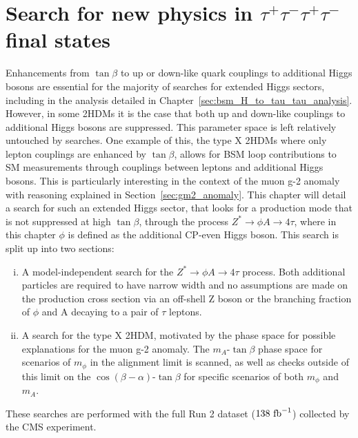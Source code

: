 \chapter{\texorpdfstring{Search for new physics in $\tau^+\tau^-\tau^+\tau^-$ final states}{Search for new physics in tautautautau final states}}
\label{sec:H_A_to_4_tau_analysis}

Enhancements from $\tan\beta$ to up or down-like quark couplings to additional Higgs bosons are essential for the majority of searches for extended Higgs sectors, including in the analysis detailed in Chapter~\ref{sec:bsm_H_to_tau_tau_analysis}.
However, in some \ac{2HDM}s it is the case that both up and down-like couplings to additional Higgs bosons are suppressed.
This parameter space is left relatively untouched by  searches.
One example of this, the type X \ac{2HDM}s where only lepton couplings are enhanced by $\tan\beta$, allows for \ac{BSM} loop contributions to \ac{SM} measurements through couplings between leptons and additional Higgs bosons.
This is particularly interesting in the context of the muon g-2 anomaly~\cite{Muong-2:2006rrc,Muong-2:2021ojo} with reasoning explained in Section~\ref{sec:gm2_anomaly}.
This chapter will detail a search for such an extended Higgs sector, that looks for a production mode that is not suppressed at high $\tan\beta$, through the process $Z^{*}\rightarrow \phi A \rightarrow 4\tau$, where in this chapter $\phi$ is defined as the additional \ac{CP}-even Higgs boson.
This search is split up into two sections:

\begin{enumerate}[i)]
  \item A model-independent search for the $Z^{*}\rightarrow \phi A \rightarrow 4\tau$ process. Both additional particles are required to have narrow width and no assumptions are made on the production cross section via an off-shell Z boson or the branching fraction of $\phi$ and A decaying to a pair of $\tau$ leptons.
   \item A search for the type X \ac{2HDM}, motivated by the phase space for possible explanations for the muon g-2 anomaly. The $m_{A}$-$\tan\beta$ phase space for scenarios of $m_\phi$ in the alignment limit is scanned, as well as checks outside of this limit on the $\cos(\beta-\alpha)$-$\tan\beta$ for specific scenarios of both $m_\phi$ and $m_A$.
\end{enumerate}

These searches are performed with the full Run 2 dataset ($138 \text{ fb}^{-1}$) collected by the \ac{CMS} experiment. 

